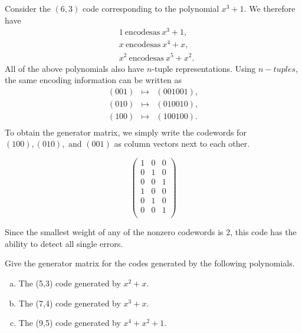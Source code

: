 \begin {example}{}
Consider the $(6,3)$ code corresponding to the polynomial $x^3+1$.  We therefore have
\begin{align*}
&1 \mathrm{~encodes as~}x^3+1,\\
&x \mathrm{~encodes as~}x^4+x,\\
&x^2 \mathrm{~encodes as~}x^5+x^2.
\end{align*}
All of the above polynomials also have $n$-tuple representations.  Using $n-tuples$, the same encoding information can be written as
\[
\begin{array}{rcl}
(001) & \mapsto & (001001),  \\
(010) & \mapsto & (010010) , \\
(100) & \mapsto & (100100). \\
\end{array}
\]
To obtain the generator matrix, we simply write the codewords for $(100), (010),$ and $(001)$ as column vectors next to each other.

\[\begin{pmatrix} 
1 & 0 & 0\\
0 & 1 & 0\\
0 & 0 & 1\\
1 & 0 & 0\\
0 & 1 & 0\\
0 & 0 & 1\\
\end{pmatrix}\]

Since the smallest weight of any of the nonzero codewords is 2, this code has the ability to detect all single errors.  

\end {example}

\begin {exercise}{}
Give the generator matrix for the codes generated by the following polynomials.
\begin {enumerate}[(a)]
\item The (5,3) code generated by $x^2 + x$.
\item The (7,4) code generated by $x^3 + x $.
\item The (9,5) code generated by $x^4 + x^2 + 1$.
\end {enumerate}
\end {exercise}

